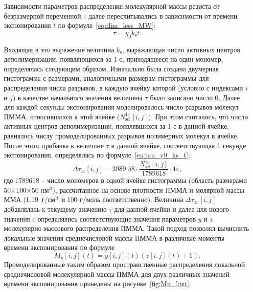 Зависимости параметров распределения молекулярной массы резиста от безразмерной переменной $\tau$ далее пересчитывались в зависимости от времени экспонирования $t$ по формуле~\ref{eq:dim_less_MW}:
\begin{equation} \label{eq:tau_y0_ks_t}
	\tau = y_0 k_\mathrm{s} t.
\end{equation}

Входящая в это выражение величина $k_\mathrm{s}$, выражающая число активных центров деполимеризации, появляющихся за 1 с, приходящееся на один мономер, определялась следующим образом.
Изначально была создана двумерная гистограмма с размерами, аналогичными размерам гистограммы для распределения числа разрывов, в каждую ячейку которой (условно с индексами $i$ и $j$) в качестве начального значения величины $\tau$ было записано число 0.
Далее для каждой секунды экспонирования моделировалось число разрывов молекул ПММА, относившихся к этой ячейке ($N_\mathrm{sci}^\mathrm{1c}[i,j]$).
При этом считалось, что число активных центров деполимеризации, появлявшихся за 1 с в данной ячейке, равнялось числу промоделированных разрывов полимерных молекул в ячейке.
После этого прибавка к величине $\tau$ в данной ячейке, соответствующая 1 секунде экспонирования, определялась по формуле~\ref{eq:tau_y0_ks_t}:
\begin{equation}
	\Delta \tau_\mathrm{1c} [i,j] = 3989.58 \cdot \frac{N_\mathrm{sci}^\mathrm{1c}[i,j]}{1789618} \cdot 1с,
\end{equation}
где 1789618 -- число мономеров в одной ячейке гистограммы (область размерами 50$\times$100$\times$50 нм$^\text{3}$), рассчитанное на основе плотности ПММА и молярной массы ММА (1.19~г/см$^\text{3}$ и 100 г/моль соответственно).
Величина $\Delta \tau_\mathrm{1c} [i,j]$ добавлялась к текущему значению $\tau$ для данной ячейки и далее для нового значения $\tau$ определялись соответствующие значения параметров $y$ и $z$ молекулярно-массового распределения ПММА.
Такой подход позволял вычислить локальные значения среднечисловой массы ПММА в различные моменты времени экспонирования по формуле
\begin{equation}
	M_\mathrm{n} [i,j] (t) = y[i,j] (t) (z [i,j] (t) + 1).
\end{equation}
Промоделированные таким образом пространственные распределения локальной среднечисловой молекулярной массы ПММА для двух различных значений времени экспонирования приведены на рисунке~\ref{fig:Mn_hist}.

